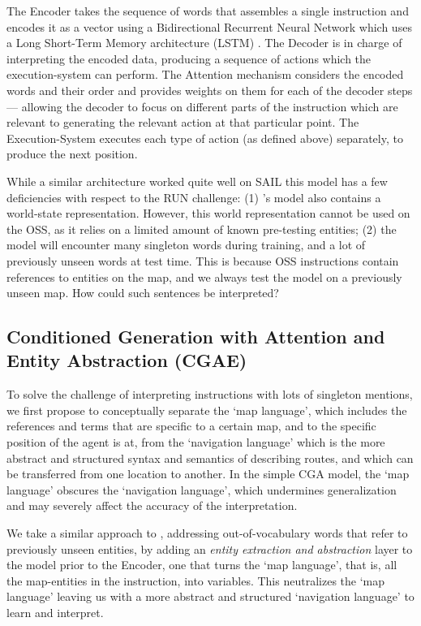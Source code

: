 \documentclass[11pt,a4paper]{article}
\begin{document}
The Encoder  takes the sequence of words that assembles a single instruction and encodes it as a vector using a Bidirectional Recurrent Neural Network which uses a Long Short-Term Memory architecture (LSTM) \citep {graves2005framewise}.  
The Decoder is in charge of interpreting the encoded data,  producing a sequence of actions which the execution-system can perform. 
%
The Attention mechanism considers the encoded words and their order and  provides weights on them for each of the decoder steps ---  allowing the decoder to focus on different parts of the instruction which are relevant to generating the  relevant action at that particular point.
%
The Execution-System executes each type of action (as defined above)  separately, to produce the next position. 

While a similar architecture worked quite well on SAIL \cite{mei2015listen} this model has a few deficiencies with respect to the RUN challenge: (1) \citet{mei2015listen}'s model also contains a world-state representation. However, this world representation cannot be used on the OSS, as it relies on a limited amount of known pre-testing entities; (2) the model will encounter many singleton words during training, and a lot of previously unseen words at test time. This is because  OSS instructions  contain  references to entities on the map, and we always test the model on a previously unseen map. How could such sentences be interpreted? 


\subsection{Conditioned Generation with Attention and Entity Abstraction (CGAE)}


To solve the challenge of interpreting  instructions with lots of singleton mentions, we first propose to conceptually separate the  \enquote*{map language}, which includes the references and terms that are specific to a certain map, and to the specific position of the agent is at,
from the \enquote*{navigation language} %
which is the more abstract and  structured syntax and semantics of describing routes, and which can be transferred from one location to another. In the simple CGA model,  the \enquote*{map language} obscures the \enquote*{navigation language}, which undermines generalization and may severely affect the accuracy of the interpretation. 

We take a similar approach to \citet{iyer2017learning,suhr2018learning},  addressing out-of-vocabulary words that refer to previously unseen entities, by adding an {\em entity extraction and abstraction} layer to the model prior to the Encoder, one that turns the \enquote*{map language}, that is, all the map-entities in the instruction, into variables. This neutralizes the \enquote*{map language} leaving us with a more abstract and structured  \enquote*{navigation language} to learn and interpret.
\end{document}
